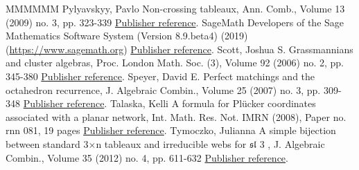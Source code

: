 \documentclass[11pt]{article}
\theoremstyle{definition}
\numberwithin{equation}{section}
\numberwithin{equation}{section}
\begin{document}
\begin{thebibliography}{MMMMMM}
 Pylyavskyy, Pavlo Non-crossing tableaux, Ann. Comb., Volume 13 (2009) no. 3, pp. 323-339 \href{https://alco.centre-mersenne.org/articles/10.5802/alco.376/#pylyavskyy2009non}{Publisher reference}.
 SageMath Developers of the Sage Mathematics Software System (Version 8.9.beta4) (2019) (\url{https://www.sagemath.org}) \href{https://alco.centre-mersenne.org/articles/10.5802/alco.376/#sagemath}{Publisher reference}.
 Scott, Joshua S. Grassmannians and cluster algebras, Proc. London Math. Soc. (3), Volume 92 (2006) no. 2, pp. 345-380 \href{https://alco.centre-mersenne.org/articles/10.5802/alco.376/#s06}{Publisher reference}.
 Speyer, David E. Perfect matchings and the octahedron recurrence, J. Algebraic Combin., Volume 25 (2007) no. 3, pp. 309-348 \href{https://alco.centre-mersenne.org/articles/10.5802/alco.376/#octahedron}{Publisher reference}.
 Talaska, Kelli A formula for Plücker coordinates associated with a planar network, Int. Math. Res. Not. IMRN (2008), Paper no. rnn 081, 19 pages \href{https://alco.centre-mersenne.org/articles/10.5802/alco.376/#Tal}{Publisher reference}.
 Tymoczko, Julianna A simple bijection between standard 3×n tableaux and irreducible webs for \(\mathfrak{s}\)\(\mathfrak{l}\) 3 , J. Algebraic Combin., Volume 35 (2012) no. 4, pp. 611-632 \href{https://alco.centre-mersenne.org/articles/10.5802/alco.376/#tymo}{Publisher reference}.
\end{thebibliography}
\end{document}
